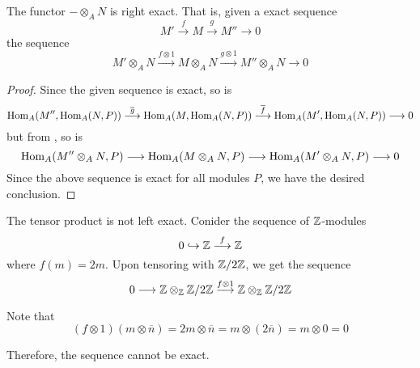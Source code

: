 \begin{theorem}
    The functor $-\otimes_A N$ is right exact. That is, given a exact sequence
    \begin{equation*}
        M'\stackrel{f}{\longrightarrow}M\stackrel{g}{\longrightarrow}M''\longrightarrow 0
    \end{equation*}
    the sequence 
    \begin{equation*}
        M'\otimes_A N\stackrel{f\otimes 1}{\longrightarrow}M\otimes_A N\stackrel{g\otimes 1}{\longrightarrow}M''\otimes_A N\longrightarrow 0
    \end{equation*}
\end{theorem}
\begin{proof}
    Since the given sequence is exact, so is 
    \begin{equation*}
        \operatorname{Hom}_A(M'',\operatorname{Hom}_A(N,P))\stackrel{\overline g}{\longrightarrow}\operatorname{Hom}_A(M,\operatorname{Hom}_A(N,P))\stackrel{\overline f}{\longrightarrow}\operatorname{Hom}_A(M',\operatorname{Hom}_A(N,P))\longrightarrow 0
    \end{equation*}
    but from , so is
    \begin{equation*}
        \operatorname{Hom}_A(M''\otimes_A N, P)\longrightarrow\operatorname{Hom}_A(M\otimes_A N, P)\longrightarrow\operatorname{Hom}_A(M'\otimes_A N, P)\longrightarrow 0
    \end{equation*}
    Since the above sequence is exact for all modules $P$, we have the desired conclusion.
\end{proof}

The tensor product is not left exact. Conider the sequence of $\mathbb{Z}$-modules
\begin{equation*}
    0\hookrightarrow\mathbb{Z}\stackrel{f}{\longrightarrow}\mathbb{Z}
\end{equation*}
where $f(m) = 2m$. Upon tensoring with $\mathbb{Z}/2\mathbb{Z}$, we get the sequence 
\begin{equation*}
    0\longrightarrow\mathbb{Z}\otimes_{\mathbb{Z}}\mathbb{Z}/2\mathbb{Z}\stackrel{f\otimes1}{\longrightarrow}\mathbb{Z}\otimes_{\mathbb{Z}}\mathbb{Z}/2\mathbb{Z}
\end{equation*}

Note that 
\begin{equation*}
    (f\otimes 1)(m\otimes\overline n) = 2m\otimes\overline{n} = m\otimes(2\overline n) = m\otimes 0 = 0
\end{equation*}

Therefore, the sequence cannot be exact.

